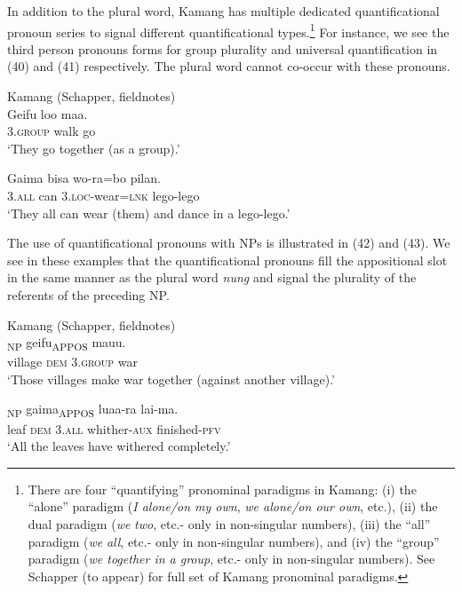 In addition to the plural word, Kamang has multiple dedicated quantificational pronoun series to signal different quantificational types.\footnote{  There are four ``quantifying'' pronominal paradigms in Kamang: (i) the ``alone'' paradigm (\textit{I alone/on my own}, \textit{we alone/on our own}, etc.), (ii) the dual paradigm (\textit{we} \textit{two}, etc.- only in non-singular numbers), (iii) the ``all'' paradigm (\textit{we} \textit{all}, etc.- only in non-singular numbers), and (iv) the ``group'' paradigm (\textit{we together in a group}, etc.- only in non-singular numbers). See Schapper (to appear) for full set of Kamang pronominal paradigms.} For instance, we see the third person pronouns forms for group plurality and universal quantification in (40) and (41) respectively. The plural word cannot co-occur with these pronouns.


\ea%
Kamang (Schapper, fieldnotes)\\
\label{ex:40}
\gll  Geifu   loo maa.  \\
  3.\textsc{group} walk go   \\
\glt `They go together (as a group).'
\z






\ea%
\label{ex:41}
\gll Gaima bisa wo-ra=bo pilan. \\
  3.\textsc{all} can   3.\textsc{loc}-wear=\textsc{lnk} lego-lego  \\
\glt `They all can wear (them) and dance in a lego-lego.'
\z






The use of quantificational pronouns with NPs is illustrated in (42) and (43). We see in these examples that the quantificational pronouns fill the appositional slot in the same manner as the plural word \textit{nung} and signal the plurality of the referents of the preceding NP.


\ea%
Kamang (Schapper, fieldnotes)\\
\label{ex:42}
\textsubscript{NP} {geifu}\textsubscript{APPOS}   {mauu.}\\
  village \textsc{dem} 3.\textsc{group} war  \\
\glt `Those villages make war together (against another village).'
\z






\ea%
\label{ex:43}
\textsubscript{NP} {gaima}\textsubscript{APPOS} luaa-ra lai-ma{.}\\
    leaf \textsc{dem}   3.\textsc{all} whither-\textsc{aux} finished-\textsc{pfv}\\
\glt `All the leaves have withered completely.'
\z






